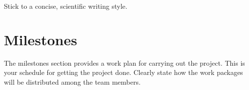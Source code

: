 \documentclass{report}
\begin{document}
Stick to a concise, scientific writing style. 

\section{Milestones}
The milestones section provides a work plan for carrying out the project.
This is your schedule for getting the project done.
Clearly state how the work packages will be distributed among the team members. 


\end{document}
